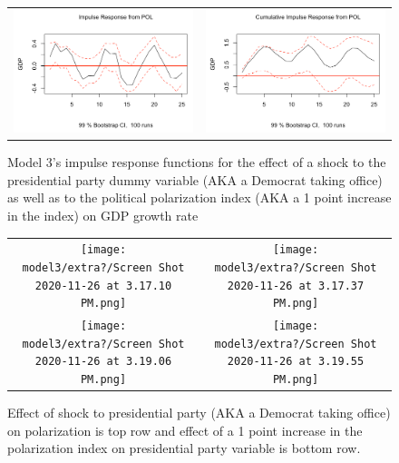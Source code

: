 \documentclass[a4paper, 12pt]{article}
\begin{document}
\begin{figure}
\begin{tabular}{cc}
    \includegraphics[scale = .39]{model3/POL/Screen Shot 2020-11-26 at 1.00.25 AM.png} & \includegraphics[scale = .39]{model3/POL/Screen Shot 2020-11-26 at 1.00.35 AM.png}
    \end{tabular}
    \caption{Model 3's impulse response functions for the effect of a shock to the presidential party dummy variable (AKA a Democrat taking office) as well as to the political polarization index (AKA a 1 point increase in the index) on GDP growth rate}
    \label{fig:my_label}
\end{figure}

\newpage
\begin{figure}
    \centering
    \begin{tabular}{cc}
    \texttt{[image: model3/extra?/Screen Shot 2020-11-26 at 3.17.10 PM.png]} & \texttt{[image: model3/extra?/Screen Shot 2020-11-26 at 3.17.37 PM.png]} \\
    \texttt{[image: model3/extra?/Screen Shot 2020-11-26 at 3.19.06 PM.png]} & \texttt{[image: model3/extra?/Screen Shot 2020-11-26 at 3.19.55 PM.png]}
    \end{tabular}
    \caption{Effect of shock to presidential party (AKA a Democrat taking office) on polarization is top row and effect of a 1 point increase in the polarization index on presidential party variable is bottom row.}
    \label{fig:my_label}
\end{figure}
\end{document}
